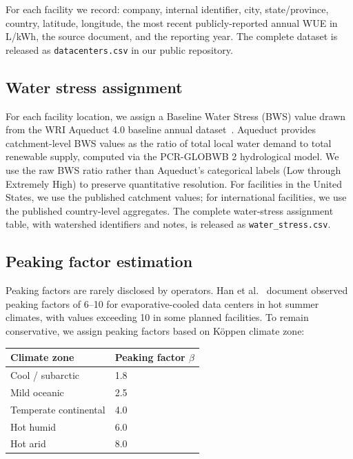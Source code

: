 \documentclass[conference,10pt]{IEEEtran}
\begin{document}
For each facility we record: company, internal identifier, city,
state/province, country, latitude, longitude, the most recent
publicly-reported annual WUE in L/kWh, the source document, and the
reporting year. The complete dataset is released as
\texttt{datacenters.csv} in our public repository.

\subsection{Water stress assignment}

For each facility location, we assign a Baseline Water Stress (BWS)
value drawn from the WRI Aqueduct 4.0 baseline annual
dataset~\cite{kuzma2023aqueduct}. Aqueduct provides catchment-level
BWS values as the ratio of total local water demand to total renewable
supply, computed via the PCR-GLOBWB 2 hydrological model. We use the
raw BWS ratio rather than Aqueduct's categorical labels (Low through
Extremely High) to preserve quantitative resolution. For facilities in
the United States, we use the published catchment values; for
international facilities, we use the published country-level
aggregates. The complete water-stress assignment table, with watershed
identifiers and notes, is released as \texttt{water\_stress.csv}.

\subsection{Peaking factor estimation}

Peaking factors are rarely disclosed by operators. Han et
al.~\cite{han2026} document observed peaking factors of 6--10 for
evaporative-cooled data centers in hot summer climates, with values
exceeding 10 in some planned facilities. To remain conservative, we
assign peaking factors based on K\"{o}ppen climate zone:

\begin{table}[h]
\centering
\small
\begin{tabular}{ll}
\toprule
\textbf{Climate zone} & \textbf{Peaking factor $\beta$} \\
\midrule
Cool / subarctic        & 1.8 \\
Mild oceanic            & 2.5 \\
Temperate continental   & 4.0 \\
Hot humid               & 6.0 \\
Hot arid                & 8.0 \\
\bottomrule
\end{tabular}
\end{table}
\end{document}
